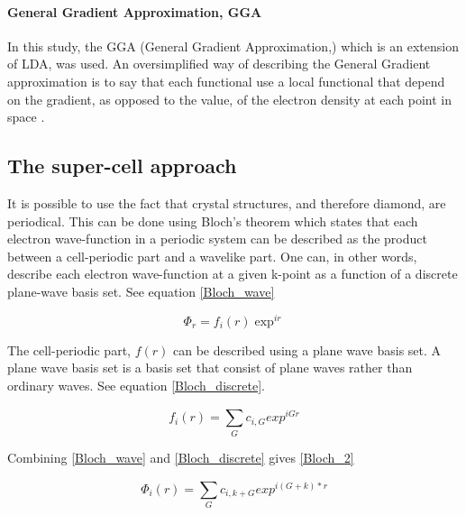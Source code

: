 \documentclass[10pt,a4paper]{article}
\begin{document}
\paragraph{General Gradient Approximation, GGA}
In this study, the GGA (General Gradient Approximation,) which is an extension of LDA, was used. An oversimplified way of describing the General Gradient approximation is to say that each functional use a local functional that depend on the gradient, as opposed to the value, of the electron density at each point in space \cite{burke}.


\subsection{The super-cell approach}
It is  possible to use the fact that crystal structures, and therefore diamond, are periodical. This can be done using Bloch's theorem which states that each electron wave-function in a periodic system can be described as the product between a cell-periodic part and a wavelike part. One can, in other words, describe each electron wave-function at a given k-point as a function of a discrete plane-wave basis set. See equation \ref{Bloch_wave}

\begin{equation}\label{Bloch_wave} \tag{Bloch's theorem 1} 
\Phi_r=f_i(r)\exp^{ir}
\end{equation}

The cell-periodic part, $f(r)$ can be described using a plane wave basis set. A plane wave basis set is a basis set that consist of plane waves rather than ordinary waves. See equation \ref{Bloch_discrete}.

\begin{equation}\label{Bloch_discrete} \tag{Bloch's theorem (discrete part 1)} 
f_i(r)=\sum\limits_{G}^{} c_{i, G} exp^{iGr}
\end{equation}

Combining \ref{Bloch_wave} and \ref{Bloch_discrete} gives \ref{Bloch_2}

\begin{equation}\label{Bloch_2} \tag{Bloch's theorem 2} 
\Phi_i(r)=\sum\limits_{G}^{} c_{i,k + G} exp^{i(G+k)*r}
\end{equation}
\end{document}

